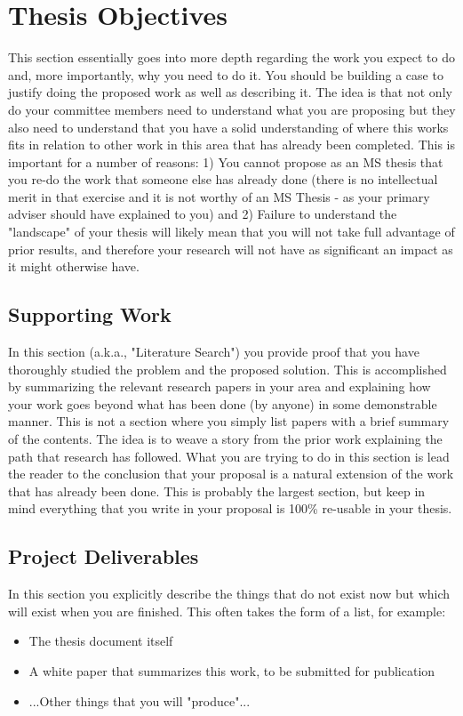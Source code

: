 \documentclass[12pt,american]{report}
\begin{document}
\body%
\chapter{Thesis Objectives}
This section essentially goes into more depth regarding the work you 
expect to do and, more importantly, why you need to do it.  You should 
be building a case to justify doing the proposed work as well as 
describing it.  The idea is that not only do your committee members need 
to understand what you are proposing but they also need to understand that 
you have a solid understanding of where this works fits in relation to other 
work in this area that has already been completed.  This is important for a 
number of reasons: 1) You cannot propose as an MS thesis that you re-do the 
work that someone else has already done (there is no intellectual merit in 
that exercise and it is not worthy of an MS Thesis - as your primary adviser 
should have explained to you) and 2) Failure to understand the "landscape" 
of your thesis will likely mean that you will not take full advantage of 
prior results, and therefore your research will not have as significant 
an impact as it might otherwise have.

\section{Supporting Work}
In this section (a.k.a., "Literature Search") you provide proof that you 
have thoroughly studied the problem and the proposed solution.  This is 
accomplished by summarizing the relevant research papers in your area 
and explaining how your work goes beyond what has been done (by anyone) 
in some demonstrable manner.  This is not a section where you simply list 
papers with a brief summary of the contents.  The idea is to weave a story 
from the prior work explaining the path that research has followed.  What 
you are trying to do in this section is lead the reader to the conclusion 
that your proposal is a natural extension of the work that has already 
been done.  This is probably the largest section, but keep in mind  
everything that you write in your proposal is 100\% re-usable in your thesis.

\section{Project Deliverables}
In this section you explicitly describe the things that do not exist now 
but which will exist when you are finished.  This often takes the form 
of a list, for example:
\begin{itemize}
\item The thesis document itself
\item A white paper that summarizes this work, to be submitted for publication
\item ...Other things that you will "produce"...
\end{itemize}
\end{document}
